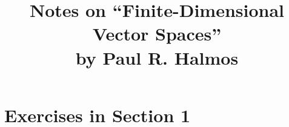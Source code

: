 \documentclass{article}
\title{Notes on ``Finite-Dimensional Vector Spaces''\\by Paul R. Halmos}
\author{}
\begin{document}
\maketitle

\section{Exercises in Section 1}
\end{document}
